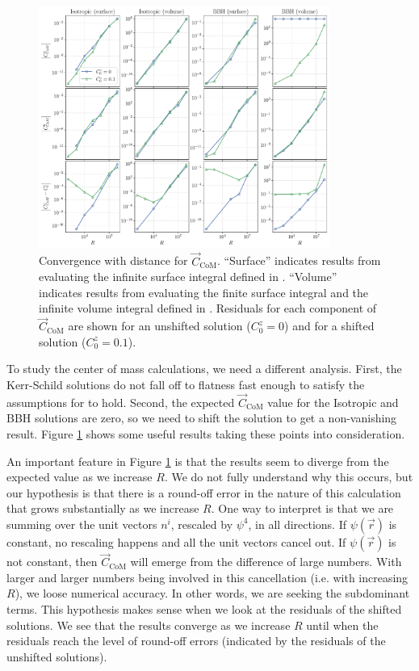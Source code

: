 \documentclass{../document}
\begin{document}
      \begin{figure}
        \centering
        \includegraphics[width=0.85\textwidth]{../../plots/final_report/distance_convergence_CoM.pdf}
        \caption{Convergence with distance for $\vec C_\text{CoM}$. ``Surface'' indicates results from evaluating the infinite surface integral defined in \eq{\eqref{eq:CoM-surf}}. ``Volume'' indicates results from evaluating the finite surface integral and the infinite volume integral defined in \eq{\eqref{eq:CoM-mixed}}. Residuals for each component of $\vec C_\text{CoM}$ are shown for an unshifted solution ($C_0^z = 0$) and for a shifted solution ($C_0^z = 0.1$).}
        \label{fig:distance_convergence_CoM}
      \end{figure}

      To study the center of mass calculations, we need a different analysis. First, the Kerr-Schild solutions do not fall off to flatness fast enough to satisfy the assumptions for \eq{\eqref{eq:CoM-surf}} to hold. Second, the expected $\vec C_\text{CoM}$ value for the Isotropic and BBH solutions are zero, so we need to shift the solution to get a non-vanishing result. Figure \ref{fig:distance_convergence_CoM} shows some useful results taking these points into consideration.
      
      An important feature in Figure \ref{fig:distance_convergence_CoM} is that the results seem to diverge from the expected value as we increase $R$. We do not fully understand why this occurs, but our hypothesis is that there is a round-off error in the nature of this calculation that grows substantially as we increase $R$. One way to interpret \eq{\eqref{eq:CoM-surf}} is that we are summing over the unit vectors $n^i$, rescaled by $\psi^4$, in all directions. If $\psi(\vec r)$ is constant, no rescaling happens and all the unit vectors cancel out. If $\psi(\vec r)$ is not constant, then $\vec C_\text{CoM}$ will emerge from the difference of large numbers. With larger and larger numbers being involved in this cancellation (i.e. with increasing $R$), we loose numerical accuracy. In other words, we are seeking the subdominant terms. This hypothesis makes sense when we look at the residuals of the shifted solutions. We see that the results converge as we increase $R$ until when the residuals reach the level of round-off errors (indicated by the residuals of the unshifted solutions).
\end{document}

